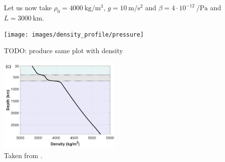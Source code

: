 Let us now take $\rho_0=\SI{4000}{\kg\per\cubic\meter}$, 
$g=\SI{10}{\meter\per\square\second}$ and $\beta=4\cdot 10^{-12}~\si{\per\pascal}$ \cite{gadb20} 
and $L=3000~\si{\km}$.

\begin{center}
\texttt{[image: images/density\_profile/pressure]}
\end{center}

TODO: produce same plot with density

\begin{center}
\includegraphics[width=6cm]{images/density_profile/nemi23}\\
{\captionfont Taken from \textcite{nemi23}.}
\end{center}
